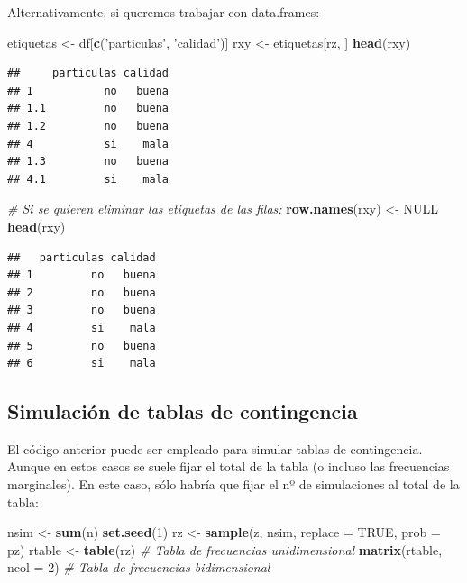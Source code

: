 \documentclass[
]{book}
\newenvironment{Shaded}{\begin{snugshade}}{\end{snugshade}}
\newcommand{\CommentTok}[1]{\textcolor[rgb]{0.56,0.35,0.01}{\textit{#1}}}
\newcommand{\DataTypeTok}[1]{\textcolor[rgb]{0.13,0.29,0.53}{#1}}
\newcommand{\DecValTok}[1]{\textcolor[rgb]{0.00,0.00,0.81}{#1}}
\newcommand{\KeywordTok}[1]{\textcolor[rgb]{0.13,0.29,0.53}{\textbf{#1}}}
\newcommand{\NormalTok}[1]{#1}
\newcommand{\OtherTok}[1]{\textcolor[rgb]{0.56,0.35,0.01}{#1}}
\newcommand{\StringTok}[1]{\textcolor[rgb]{0.31,0.60,0.02}{#1}}
\theoremstyle{break}
\theoremstyle{definition}
\theoremstyle{definition}
\theoremstyle{definition}
\theoremstyle{remark}
\begin{document}
Alternativamente, si queremos trabajar con data.frames:

\begin{Shaded}
\begin{Highlighting}[]
\NormalTok{etiquetas <-}\StringTok{ }\NormalTok{df[}\KeywordTok{c}\NormalTok{(}\StringTok{'particulas'}\NormalTok{, }\StringTok{'calidad'}\NormalTok{)]}
\NormalTok{rxy <-}\StringTok{ }\NormalTok{etiquetas[rz, ]}
\KeywordTok{head}\NormalTok{(rxy)}
\end{Highlighting}
\end{Shaded}

\begin{verbatim}
##     particulas calidad
## 1           no   buena
## 1.1         no   buena
## 1.2         no   buena
## 4           si    mala
## 1.3         no   buena
## 4.1         si    mala
\end{verbatim}

\begin{Shaded}
\begin{Highlighting}[]
\CommentTok{# Si se quieren eliminar las etiquetas de las filas:}
\KeywordTok{row.names}\NormalTok{(rxy) <-}\StringTok{ }\OtherTok{NULL}
\KeywordTok{head}\NormalTok{(rxy)}
\end{Highlighting}
\end{Shaded}

\begin{verbatim}
##   particulas calidad
## 1         no   buena
## 2         no   buena
## 3         no   buena
## 4         si    mala
## 5         no   buena
## 6         si    mala
\end{verbatim}

\hypertarget{simconting}{%
\subsection{Simulación de tablas de contingencia}\label{simconting}}

El código anterior puede ser empleado para simular tablas de contingencia.
Aunque en estos casos se suele fijar el total de la tabla (o incluso las frecuencias marginales).
En este caso, sólo habría que fijar el nº de simulaciones al total de la tabla:

\begin{Shaded}
\begin{Highlighting}[]
\NormalTok{nsim <-}\StringTok{ }\KeywordTok{sum}\NormalTok{(n)}
\KeywordTok{set.seed}\NormalTok{(}\DecValTok{1}\NormalTok{)}
\NormalTok{rz <-}\StringTok{ }\KeywordTok{sample}\NormalTok{(z, nsim, }\DataTypeTok{replace =} \OtherTok{TRUE}\NormalTok{, }\DataTypeTok{prob =}\NormalTok{ pz)}
\NormalTok{rtable <-}\StringTok{ }\KeywordTok{table}\NormalTok{(rz) }\CommentTok{# Tabla de frecuencias unidimensional}
\KeywordTok{matrix}\NormalTok{(rtable, }\DataTypeTok{ncol =} \DecValTok{2}\NormalTok{) }\CommentTok{# Tabla de frecuencias bidimensional}
\end{Highlighting}
\end{Shaded}
\end{document}
